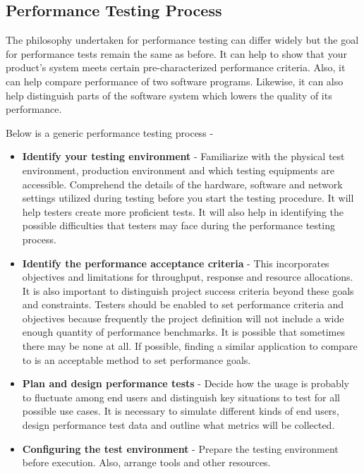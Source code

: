 \documentclass[../thesis.tex]{subfiles}
\begin{document}
	\subsection*{Performance Testing Process}
	The philosophy undertaken for performance testing can differ widely but the goal for performance tests remain the same as before. It can help to show that your product's system meets certain pre-characterized performance criteria. Also, it can help compare performance of two software programs. Likewise, it can also help distinguish parts of the software system which lowers the quality of its performance.
	\newline
    
	Below is a generic performance testing process -

	\begin{itemize}
		\item \textbf{Identify your testing environment} - Familiarize with the physical test environment, production environment and which testing equipments are accessible. Comprehend the details of the hardware, software and network settings utilized during testing before you start the testing procedure. It will help testers create more proficient tests.  It will also help in identifying the possible difficulties that testers may face during the performance testing process.

		\item \textbf{Identify the performance acceptance criteria} - This incorporates objectives and limitations for throughput, response and resource allocations.  It is also important to distinguish project success criteria beyond these goals and constraints. Testers should be enabled to set performance criteria and objectives because frequently the project definition will not include a wide enough quantity of performance benchmarks. It is possible that sometimes there may be none at all. If possible, finding a similar application to compare to is an acceptable method to set performance goals.

		\item \textbf{Plan and design performance tests} - Decide how the usage is probably to fluctuate among end users and distinguish key situations to test for all possible use cases. It is necessary to simulate different kinds of end users, design performance test data and outline what metrics will be collected.

		\item \textbf{Configuring the test environment} - Prepare the testing environment before execution. Also, arrange tools and other resources.


\end{itemize}
\end{document}
